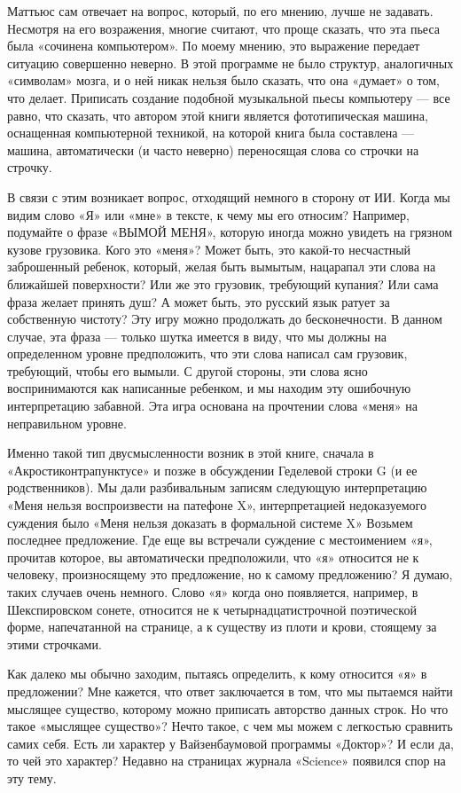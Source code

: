 \documentclass[../main.tex]{subfiles}
\begin{document}
Маттьюс сам отвечает на вопрос, который, по его мнению, лучше не задавать. Несмотря на его возражения, многие считают, что проще сказать, что эта пьеса была «сочинена компьютером». По моему мнению, это выражение передает ситуацию совершенно неверно. В этой программе не было структур, аналогичных «символам» мозга, и о ней никак нельзя было сказать, что она «думает» о том, что делает. Приписать создание подобной музыкальной пьесы компьютеру --- все равно, что сказать, что автором этой книги является фототипическая машина, оснащенная компьютерной техникой, на которой книга была составлена --- машина, автоматически (и часто неверно) переносящая слова со строчки на строчку.

В связи с этим возникает вопрос, отходящий немного в сторону от ИИ. Когда мы видим слово «Я» или «мне» в тексте, к чему мы его относим? Например, подумайте о фразе «ВЫМОЙ МЕНЯ», которую иногда можно увидеть на грязном кузове грузовика. Кого это «меня»? Может быть, это какой-то несчастный заброшенный ребенок, который, желая быть вымытым, нацарапал эти слова на ближайшей поверхности? Или же это грузовик, требующий купания? Или сама фраза желает принять душ? А может быть, это русский язык ратует за собственную чистоту? Эту игру можно продолжать до бесконечности. В данном случае, эта фраза --- только шутка имеется в виду, что мы должны на определенном уровне предположить, что эти слова написал сам грузовик, требующий, чтобы его вымыли. С другой стороны, эти слова ясно воспринимаются как написанные ребенком, и мы находим эту ошибочную интерпретацию забавной. Эта игра основана на прочтении слова «меня» на неправильном уровне.

Именно такой тип двусмысленности возник в этой книге, сначала в «Акростиконтрапунктусе» и позже в обсуждении Геделевой строки G (и ее родственников). Мы дали разбивальным записям следующую интерпретацию «Меня нельзя воспроизвести на патефоне X», интерпретацией недоказуемого суждения было «Меня нельзя доказать в формальной системе X» Возьмем последнее предложение. Где еще вы встречали суждение с местоимением «я», прочитав которое, вы автоматически предположили, что «я» относится не к человеку, произносящему это предложение, но к самому предложению? Я думаю, таких случаев очень немного. Слово «я» когда оно появляется, например, в Шекспировском сонете, относится не к четырнадцатистрочной поэтической форме, напечатанной на странице, а к существу из плоти и крови, стоящему за этими строчками.

Как далеко мы обычно заходим, пытаясь определить, к кому относится «я» в предложении? Мне кажется, что ответ заключается в том, что мы пытаемся найти мыслящее существо, которому можно приписать авторство данных строк. Но что такое «мыслящее существо»? Нечто такое, с чем мы можем с легкостью сравнить самих себя. Есть ли характер у Вайзенбаумовой программы «Доктор»? И если да, то чей это характер? Недавно на страницах журнала «Science» появился спор на эту тему.
\end{document}
